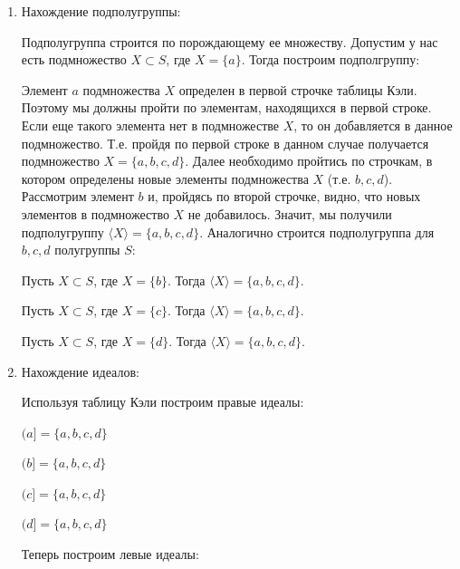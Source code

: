 \documentclass[bachelor, och, labwork]{shiza}
\begin{document}
    \begin{enumerate}
      \item Нахождение подполугруппы:
    
      Подполугруппа строится по порождающему ее множеству. Допустим у нас есть подмножество $X \subset S$, где $X = \{ a\}$. 
      Тогда построим подполгруппу:
  
      Элемент $a$ подмножества $X$ определен в первой строчке таблицы Кэли. Поэтому мы должны пройти по элементам, находящихся в первой
      строке. Если еще такого элемента нет в подмножестве $X$, то он добавляется в данное подмножество. Т.е. пройдя по первой строке в
      данном случае получается подмножество $X = \{a, b, c, d\}$. Далее необходимо пройтись по строчкам, в котором определены новые элементы
      подмножества $X$ (т.е. $b, c, d$). Рассмотрим элемент $b$ и, пройдясь по второй строчке, видно, что новых элементов в подмножество $X$
      не добавилось. Значит, мы получили подполугруппу $\langle X \rangle = \{a, b, c, d\}$.  
      Аналогично строится подполугруппа для $b,c,d$ полугруппы $S$:

      Пусть $X \subset S$, где $X = \{b\}$. Тогда $\langle X \rangle = \{a, b, c, d\}$.

      Пусть $X \subset S$, где $X = \{c\}$. Тогда $\langle X \rangle = \{a, b, c, d\}$.

      Пусть $X \subset S$, где $X = \{d\}$. Тогда $\langle X \rangle = \{a, b, c, d\}$.
      
      \item Нахождение идеалов:
      
      Используя таблицу Кэли построим правые идеалы:
      
      \begin{center}

        $(a] = \{a, b, c, d\}$

        $(b] = \{a, b, c, d\}$
  
        $(c] = \{a, b, c, d\}$
  
        $(d] = \{a, b, c, d\}$
    
      \end{center}
    
      
      Теперь построим левые идеалы:


\end{enumerate}
\end{document}
